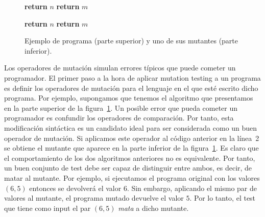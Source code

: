 \begin{figure}[t]

\begin{algorithmic}[1]
    \State  \textbf{return} $n$
\Else
    \State \textbf{return} $m$
\EndIf
\EndProcedure
\end{algorithmic}
\vspace*{2em}

\begin{algorithmic}[1]
    \State  \textbf{return} $n$
\Else
    \State \textbf{return} $m$
\EndIf
\EndProcedure
\end{algorithmic}
%
\caption{Ejemplo de programa (parte superior) y uno de sus mutantes (parte inferior).}
\label{fig:fig_ejemplo_mutante}
\end{figure}



Los operadores de mutación simulan errores típicos que puede cometer un programador. El primer paso a la hora de aplicar mutation testing a un programa es definir los operadores de mutación para el lenguaje en el que esté escrito dicho programa. Por ejemplo, supongamos que tenemos el  algoritmo que presentamos en la  parte superior de la figura~\ref{fig:fig_ejemplo_mutante}.
%
Un posible error que pueda cometer un programador es confundir los operadores de comparación. Por tanto, esta modificación sintáctica es un candidato ideal para ser considerada como un buen operador de mutación. Si aplicamos este operador al código anterior en la línea~2 se obtiene el  mutante que aparece en la parte inferior de la figura~\ref{fig:fig_ejemplo_mutante}.
%
Es claro que el comportamiento de los dos algoritmos anteriores no es equivalente. Por tanto,  un buen conjunto de test debe ser capaz de distinguir entre ambos, es decir, de matar al mutante. 
%
Por ejemplo, si ejecutamos el programa original con los valores $(6,5)$ entonces se  devolverá el valor $6$. Sin embargo, aplicando el mismo par de valores al mutante, el programa mutado devuelve el valor $5$. Por lo tanto, el test que tiene como input el par $(6,5)$ \emph{mata} a dicho mutante.

